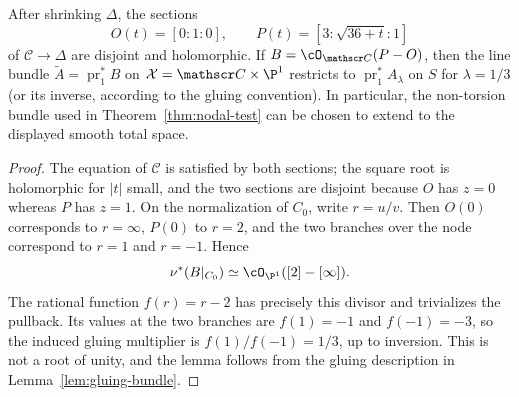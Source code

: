 \begin{lemma}
\label{lem:extending-gluing}
After shrinking $\Delta$, the sections
\[
 O(t)=[0:1:0],\qquad
 P(t)=[3:\sqrt{36+t}:1]
\tag{4.5a}
\]
of $\mathscr C\to\Delta$ are disjoint and holomorphic.  If
$B=\cO_{\mathscr C}(P-O)$, then the line bundle
$\widetilde A=\operatorname{pr}_1^*B$ on $\mathcal X=\mathscr C\times\P^1$
restricts to $\operatorname{pr}_1^*A_{\lambda}$ on $S$ for
$\lambda=1/3$ (or its inverse, according to the gluing convention).  In
particular, the non-torsion bundle used in Theorem~\ref{thm:nodal-test} can
be chosen to extend to the displayed smooth total space.
\end{lemma}

\begin{proof}
The equation of $\mathscr C$ is satisfied by both sections; the square root
is holomorphic for $|t|$ small, and the two sections are disjoint because
$O$ has $z=0$ whereas $P$ has $z=1$.  On the normalization of $C_0$, write
$r=u/v$.  Then $O(0)$ corresponds to $r=\infty$, $P(0)$ to $r=2$, and the
two branches over the node correspond to $r=1$ and $r=-1$.  Hence
\[
 \nu^*(B|_{C_0})\simeq\cO_{\P^1}([2]-[\infty]).
\]
The rational function $f(r)=r-2$ has precisely this divisor and trivializes
the pullback.  Its values at the two branches are $f(1)=-1$ and
$f(-1)=-3$, so the induced gluing multiplier is $f(1)/f(-1)=1/3$,
up to inversion.  This is not a root of unity, and the lemma follows from
the gluing description in Lemma~\ref{lem:gluing-bundle}.
\end{proof}


